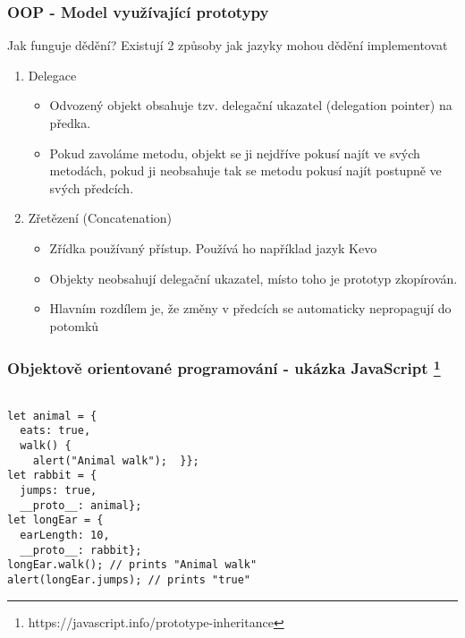 \begin{frame}
    \frametitle{OOP - Model využívající prototypy}

    Jak funguje dědění?\break
    Existují 2 způsoby jak jazyky mohou dědění implementovat

    \begin{enumerate}
        \item Delegace \begin{itemize}
            \item Odvozený objekt obsahuje tzv. delegační ukazatel (delegation pointer) na předka.
            \item Pokud zavoláme metodu, objekt se ji nejdříve pokusí najít ve svých metodách, pokud ji neobsahuje tak se metodu pokusí najít postupně ve svých předcích.  
        \end{itemize}
        \item Zřetězení (Concatenation) \begin{itemize}
            \item Zřídka používaný přístup. Používá ho například jazyk Kevo
            \item Objekty neobsahují delegační ukazatel, místo toho je prototyp zkopírován.
            \item Hlavním rozdílem je, že změny v předcích se automaticky nepropagují do potomků
        \end{itemize}
    \end{enumerate}

\end{frame}


\begin{frame}[fragile]
    \frametitle{Objektově orientované programování - ukázka JavaScript \footnote{https://javascript.info/prototype-inheritance}   }
\begin{lstlisting}[]

let animal = {
  eats: true,
  walk() {
    alert("Animal walk");  }};
let rabbit = {
  jumps: true,
  __proto__: animal};
let longEar = {
  earLength: 10,
  __proto__: rabbit};
longEar.walk(); // prints "Animal walk"
alert(longEar.jumps); // prints "true"

\end{lstlisting}
    
\end{frame}